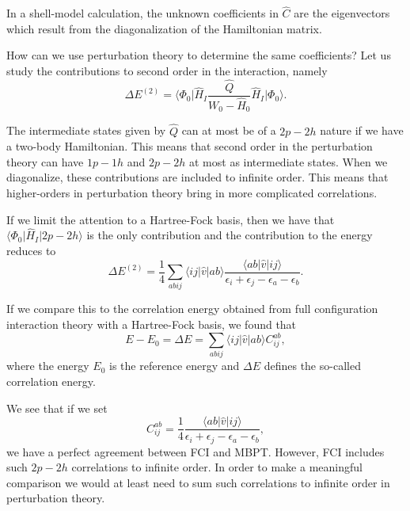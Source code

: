 In a shell-model calculation, the unknown coefficients in $\hat{C}$ are the 
eigenvectors which result from the diagonalization of the Hamiltonian matrix.

How can we use perturbation theory to determine the same coefficients? Let us study the contributions to second order in the interaction, namely
\[
\Delta E^{(2)}=\langle\Phi_0\vert \hat{H}_I\frac{\hat{Q}}{W_0-\hat{H}_0}\hat{H}_I\vert \Phi_0\rangle.
\]

The intermediate states given by $\hat{Q}$ can at most be of a $2p-2h$ nature if we have a two-body Hamiltonian. This means that second order in the perturbation theory can have $1p-1h$ and $2p-2h$ at most as intermediate states. When we diagonalize, these contributions are included to infinite order. This means that higher-orders in perturbation theory bring in more complicated correlations. 

If we limit the attention to a Hartree-Fock basis, then we have that
$\langle\Phi_0\vert \hat{H}_I \vert 2p-2h\rangle$ is the only contribution and the contribution to the energy reduces to
\[
\Delta E^{(2)}=\frac{1}{4}\sum_{abij}\langle ij\vert \hat{v}\vert ab\rangle \frac{\langle ab\vert \hat{v}\vert ij\rangle}{\epsilon_i+\epsilon_j-\epsilon_a-\epsilon_b}.
\]

If we compare this to the correlation energy obtained from full configuration interaction theory with a Hartree-Fock basis, we found that
\[
E-E_0 =\Delta E=
\sum_{abij}\langle ij | \hat{v}| ab \rangle C_{ij}^{ab},
\]
where the energy $E_0$ is the reference energy and $\Delta E$ defines the so-called correlation energy.

We see that if we set
\[
C_{ij}^{ab} =\frac{1}{4}\frac{\langle ab \vert \hat{v} \vert ij \rangle}{\epsilon_i+\epsilon_j-\epsilon_a-\epsilon_b},
\]
we have a perfect agreement between FCI and MBPT. However, FCI includes such $2p-2h$ correlations to infinite order. In order to make a meaningful comparison we would at least need to sum such correlations to infinite order in perturbation theory. 

